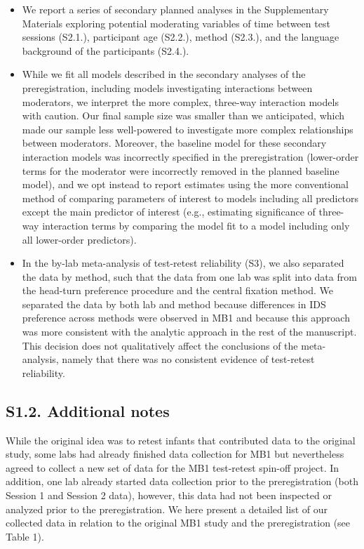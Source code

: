 \documentclass[
  english,
  man, donotrepeattitle,floatsintext]{apa6}
\begin{document}
\begin{itemize}
\item
  We report a series of secondary planned analyses in the Supplementary Materials exploring potential moderating variables of time between test sessions (S2.1.), participant age (S2.2.), method (S2.3.), and the language background of the participants (S2.4.).
\item
  While we fit all models described in the secondary analyses of the preregistration, including models investigating interactions between moderators, we interpret the more complex, three-way interaction models with caution. Our final sample size was smaller than we anticipated, which made our sample less well-powered to investigate more complex relationships between moderators. Moreover, the baseline model for these secondary interaction models was incorrectly specified in the preregistration (lower-order terms for the moderator were incorrectly removed in the planned baseline model), and we opt instead to report estimates using the more conventional method of comparing parameters of interest to models including all predictors except the main predictor of interest (e.g., estimating significance of three-way interaction terms by comparing the model fit to a model including only all lower-order predictors).
\item
  In the by-lab meta-analysis of test-retest reliability (S3), we also separated the data by method, such that the data from one lab was split into data from the head-turn preference procedure and the central fixation method. We separated the data by both lab and method because differences in IDS preference across methods were observed in MB1 and because this approach was more consistent with the analytic approach in the rest of the manuscript. This decision does not qualitatively affect the conclusions of the meta-analysis, namely that there was no consistent evidence of test-retest reliability.
\end{itemize}

\hypertarget{s1.2.-additional-notes}{%
\subsection{S1.2. Additional notes}\label{s1.2.-additional-notes}}

While the original idea was to retest infants that contributed data to the original study, some labs had already finished data collection for MB1 but nevertheless agreed to collect a new set of data for the MB1 test-retest spin-off project. In addition, one lab already started data collection prior to the preregistration (both Session 1 and Session 2 data), however, this data had not been inspected or analyzed prior to the preregistration. We here present a detailed list of our collected data in relation to the original MB1 study and the preregistration (see Table 1).
\end{document}
